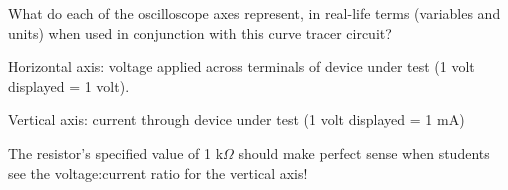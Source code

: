 

What do each of the oscilloscope axes represent, in real-life terms (variables and units) when used in conjunction with this curve tracer circuit?







Horizontal axis: voltage applied across terminals of device under test (1 volt displayed = 1 volt).

\vskip 10pt

Vertical axis: current through device under test (1 volt displayed = 1 mA)







The resistor's specified value of 1 k$\Omega$ should make perfect sense when students see the voltage:current ratio for the vertical axis!



